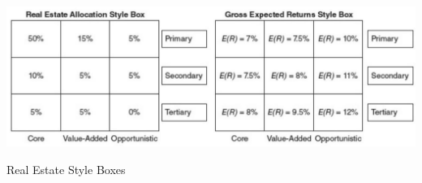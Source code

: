 \documentclass[11pt]{article}
\begin{document}
\begin{center}
\includegraphics[max width=\textwidth]{2024_04_11_515942530f610ac594f4g-2}
\end{center}

Real Estate Style Boxes
\end{document}
